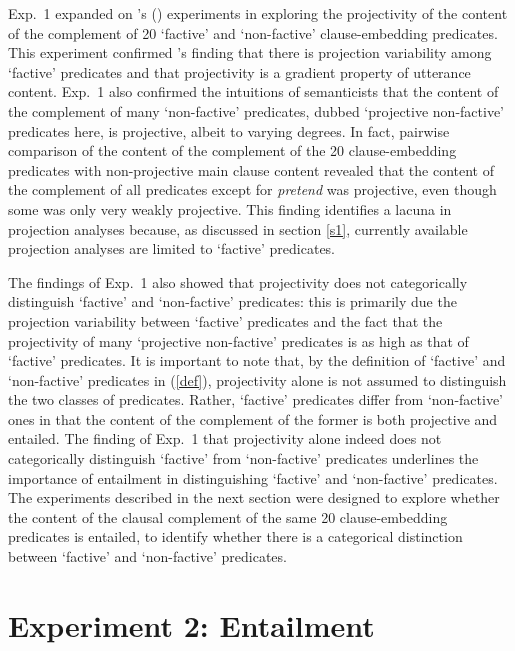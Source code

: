 \documentclass[11pt,fleqn]{article}
\newcommand{\6}{\mbox{$[\hspace*{-.6mm}[$}}
\newcommand{\9}{\mbox{$]\hspace*{-.6mm}]$}}
\newcommand{\citepos}[1]{\citeauthor{#1}'s \citeyear{#1}}
\newcommand{\citetpos}[1]{\citeauthor{#1}'s (\citeyear{#1})}
\begin{document}
Exp.~1 expanded on \citetpos{tbd-variability} experiments in exploring the projectivity of the content of the complement of 20 `factive' and `non-factive' clause-embedding predicates. This experiment confirmed 
\citepos{tbd-variability} finding that there is projection variability among `factive' predicates and that projectivity is a gradient property of utterance content. Exp.~1 also confirmed the intuitions of semanticists that the content of the complement of many `non-factive' predicates, dubbed `projective non-factive' predicates here, is projective, albeit to varying degrees. In fact, pairwise comparison of the content of the complement of the 20 clause-embedding predicates with non-projective main clause content revealed that the content of the complement of all predicates except for {\em pretend} was projective, even though some was only very weakly projective. This finding identifies a lacuna in projection analyses because, as discussed in section \ref{s1}, currently available projection analyses are limited to `factive' predicates. 

The findings of Exp.~1 also showed that projectivity does not categorically distinguish `factive' and `non-factive' predicates: this is primarily due the projection variability between `factive' predicates and the fact that the projectivity of many `projective non-factive' predicates is as high as that of `factive' predicates. It is important to note that, by the definition of `factive' and `non-factive' predicates in (\ref{def}), projectivity alone is not assumed to distinguish the two classes of predicates. Rather, `factive' predicates differ from `non-factive' ones in that the content of the complement of the former is both projective and entailed. The finding of Exp.~1 that projectivity alone indeed does not categorically distinguish `factive' from `non-factive' predicates underlines the importance of entailment in distinguishing `factive' and `non-factive' predicates. The experiments described in the next section were designed to explore whether the content of the clausal complement of the same 20 clause-embedding predicates is entailed, to identify whether there is a categorical distinction between `factive' and `non-factive' predicates. 

\section{Experiment 2: Entailment}\label{s3}
\end{document}

